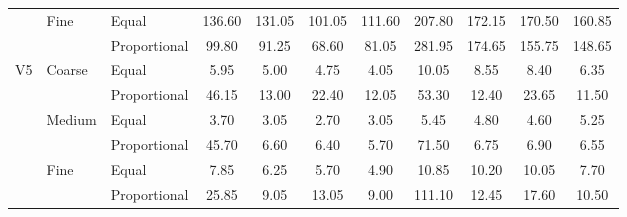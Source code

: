 \documentclass[10pt,journal,compsoc]{IEEEtran}
\begin{document}
\begin{table}
\begin{tabular}{|c|l|l|c|c|c|c|c|c|c|c|}
	& Fine	& Equal	& 136.60	& 131.05	& 101.05	& 111.60	& 207.80	& 172.15	& 170.50	& 160.85	\\ \cline{3-11}
	& 	& Proportional	& 99.80	& 91.25	& 68.60	& 81.05	& 281.95	& 174.65	& 155.75	& 148.65	\\ \hline
V5	& Coarse	& Equal	& 5.95	& 5.00	& 4.75	& 4.05	& 10.05	& 8.55	& 8.40	& 6.35	\\ \cline{3-11}
	& 	& Proportional	& 46.15	& 13.00	& 22.40	& 12.05	& 53.30	& 12.40	& 23.65	& 11.50	\\ \cline{2-11}
	& Medium	& Equal	& 3.70	& 3.05	& 2.70	& 3.05	& 5.45	& 4.80	& 4.60	& 5.25	\\ \cline{3-11}
	& 	& Proportional	& 45.70	& 6.60	& 6.40	& 5.70	& 71.50	& 6.75	& 6.90	& 6.55	\\ \cline{2-11}
	& Fine	& Equal	& 7.85	& 6.25	& 5.70	& 4.90	& 10.85	& 10.20	& 10.05	& 7.70	\\ \cline{3-11}
	& 	& Proportional	& 25.85	& 9.05	& 13.05	& 9.00	& 111.10	& 12.45	& 17.60	& 10.50	\\ \hline
\end{tabular}
\end{table}
\end{document}
